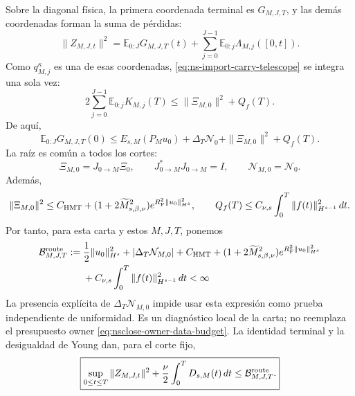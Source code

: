 Sobre la diagonal física, la primera coordenada terminal es
\(G_{M,J,T}\), y las demás coordenadas forman la suma de pérdidas:
\begin{equation}
 \|Z_{M,J,t}\|^2
 =\mathbb E_{0:J}G_{M,J,T}(t)
 +\sum_{j=0}^{J-1}\mathbb E_{0:j}\Lambda_{M,j}([0,t]).
 \label{eq:ns-import-ledger}
\end{equation}
Como \(q_{M,j}^{\kappa}\) es una de esas coordenadas,
\eqref{eq:ns-import-carry-telescope} se integra una sola vez:
\begin{equation}
 2\sum_{j=0}^{J-1}\mathbb E_{0:j}K_{M,j}(T)
 \le\|\Xi_{M,0}\|^2+Q_f(T).
 \label{eq:ns-import-carry-funded}
\end{equation}
De aquí,
\begin{equation}
 \mathbb E_{0:J}G_{M,J,T}(0)
 \le E_{s,M}(P_Mu_0)
 +\Delta_T\mathcal N_0+\|\Xi_{M,0}\|^2+Q_f(T).
 \label{eq:ns-import-root-bound}
\end{equation}
La raíz es común a todos los cortes:
\begin{equation}
 \Xi_{M,0}=J_{0\to M}\Xi_0,
 \qquad J_{0\to M}^*J_{0\to M}=I,
 \qquad \mathcal N_{M,0}=\mathcal N_0.
 \label{eq:ns-import-common-root}
\end{equation}
Además,
\begin{equation}
 \|\Xi_{M,0}\|^2
 \le C_{\rm HMT}
 +(1+2\widetilde M_{s,\beta,\nu}^2)
 e^{R_{\rm F}^2\|u_0\|_{H^s}^2},
 \qquad
 Q_f(T)\le C_{\nu,s}\int_0^T\|f(t)\|_{H^{s-1}}^2\,dt.
 \label{eq:ns-import-root-data-bound}
\end{equation}
Por tanto, para esta carta y estos \(M,J,T\), ponemos
\begin{align}
 \mathcal B_{M,J,T}^{\rm route}:={}&
 \frac12\|u_0\|_{H^s}^2
 +|\Delta_T\mathcal N_{M,0}|+C_{\rm HMT}
 +(1+2\widetilde M_{s,\beta,\nu}^2)
 e^{R_{\rm F}^2\|u_0\|_{H^s}^2}\notag\\
 &+C_{\nu,s}\int_0^T\|f(t)\|_{H^{s-1}}^2\,dt
 <\infty
 \label{eq:ns-import-explicit-budget}
\end{align}
La presencia explícita de \(\Delta_T\mathcal N_{M,0}\) impide usar esta
expresión como prueba independiente de uniformidad. Es un diagnóstico local
de la carta; no reemplaza el presupuesto owner
\eqref{eq:nsclose-owner-data-budget}. La identidad terminal y la desigualdad
de Young dan, para el corte fijo,
\begin{equation}
 \boxed{
 \sup_{0\le t\le T}\|Z_{M,J,t}\|^2
 +\frac{\nu}{2}\int_0^TD_{s,M}(t)\,dt
 \le\mathcal B_{M,J,T}^{\rm route}.}
 \label{eq:ns-import-uniform-budget}
\end{equation}

